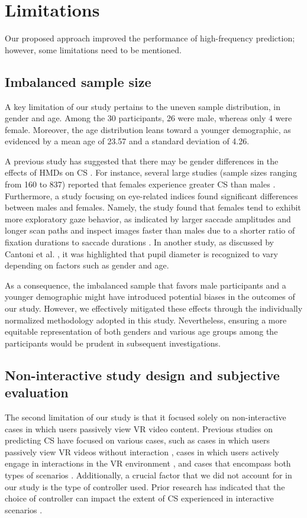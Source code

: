 \documentclass{ieeeaccess}
\begin{document}
\section{Limitations}
Our proposed approach improved the performance of high-frequency prediction; however, some limitations need to be mentioned.

\subsection{Imbalanced sample size}
A key limitation of our study pertains to the uneven sample distribution, in gender and age. Among the 30 participants, 26 were male, whereas only 4 were female. Moreover, the age distribution leans toward a younger demographic, as evidenced by a mean age of 23.57 and a standard deviation of 4.26.

A previous study has suggested that there may be gender differences in the effects of HMDs on CS \cite{Munafo_2017}. For instance, several large studies (sample sizes ranging from 160 to 837) reported that females experience greater CS than males \cite{Shafer_2019, Luong_2022, Doty_2023}. Furthermore, a study focusing on eye-related indices found significant differences between males and females. Namely, the study found that females tend to exhibit more exploratory gaze behavior, as indicated by larger saccade amplitudes and longer scan paths and inspect images faster than males due to a shorter ratio of fixation durations to saccade durations \cite{Bahman_2019}. 
In another study, as discussed by Cantoni et al. \cite{Cantoni_2020}, it was highlighted that pupil diameter is recognized to vary depending on factors such as gender and age.

As a consequence, the imbalanced sample that favors male participants and a younger demographic might have introduced potential biases in the outcomes of our study. 
However, we effectively mitigated these effects through the individually normalized methodology adopted in this study. Nevertheless, ensuring a more equitable representation of both genders and various age groups among the participants would be prudent in subsequent investigations. 

\subsection{Non-interactive study design and subjective evaluation}
The second limitation of our study is that it focused solely on non-interactive cases in which users passively view VR video content. Previous studies on predicting CS have focused on various cases, such as cases in which users passively view VR videos without interaction \cite{Islam_2_2020, Chang_2021}, cases in which users actively engage in interactions in the VR environment \cite{Lopes_2020, Monteiro_2021, Wang_2022}, and cases that encompass both types of scenarios \cite{Islam_2021, Islam_2022}. 
Additionally, a crucial factor that we did not account for in our study is the type of controller used. Prior research has indicated that the choice of controller can impact the extent of CS experienced in interactive scenarios \cite{Monteiro_2020}.
\end{document}
